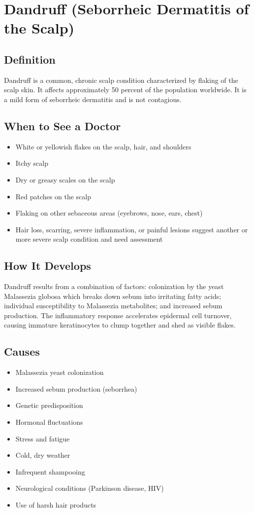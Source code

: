 \chapter{Dandruff (Seborrheic Dermatitis of the Scalp)}

\section*{Definition}
Dandruff is a common, chronic scalp condition characterized by flaking of the scalp skin. It affects approximately 50 percent of the population worldwide. It is a mild form of seborrheic dermatitis and is not contagious.

\section*{When to See a Doctor}
\begin{itemize}
\item White or yellowish flakes on the scalp, hair, and shoulders
\item Itchy scalp
\item Dry or greasy scales on the scalp
\item Red patches on the scalp
\item Flaking on other sebaceous areas (eyebrows, nose, ears, chest)
 \item Hair loss, scarring, severe inflammation, or painful lesions suggest another or more severe scalp condition and need assessment
\end{itemize}

\section*{How It Develops}
Dandruff results from a combination of factors: colonization by the yeast Malassezia globosa which breaks down sebum into irritating fatty acids; individual susceptibility to Malassezia metabolites; and increased sebum production. The inflammatory response accelerates epidermal cell turnover, causing immature keratinocytes to clump together and shed as visible flakes.

\section*{Causes}
\begin{itemize}
\item Malassezia yeast colonization
\item Increased sebum production (seborrhea)
\item Genetic predisposition
\item Hormonal fluctuations
\item Stress and fatigue
\item Cold, dry weather
\item Infrequent shampooing
\item Neurological conditions (Parkinson disease, HIV)
\item Use of harsh hair products
\end{itemize}

